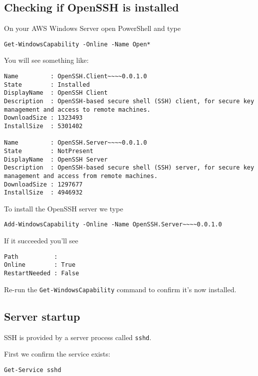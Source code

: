 \subsection{Checking if OpenSSH is
installed}\label{checking-if-openssh-is-installed}

On your AWS Windows Server open PowerShell and type

\begin{verbatim}
Get-WindowsCapability -Online -Name Open*
\end{verbatim}

You will see something like:

\begin{verbatim}
Name         : OpenSSH.Client~~~~0.0.1.0
State        : Installed
DisplayName  : OpenSSH Client
Description  : OpenSSH-based secure shell (SSH) client, for secure key management and access to remote machines.
DownloadSize : 1323493
InstallSize  : 5301402

Name         : OpenSSH.Server~~~~0.0.1.0
State        : NotPresent
DisplayName  : OpenSSH Server
Description  : OpenSSH-based secure shell (SSH) server, for secure key management and access from remote machines.
DownloadSize : 1297677
InstallSize  : 4946932
\end{verbatim}

To install the OpenSSH server we type

\begin{verbatim}
Add-WindowsCapability -Online -Name OpenSSH.Server~~~~0.0.1.0
\end{verbatim}

If it succeeded you'll see

\begin{verbatim}
Path          :
Online        : True
RestartNeeded : False
\end{verbatim}

Re-run the \texttt{Get-WindowsCapability} command to confirm it's now
installed.

\subsection{Server startup}\label{server-startup}

SSH is provided by a server process called \texttt{sshd}.

First we confirm the service exists:

\begin{verbatim}
Get-Service sshd
\end{verbatim}

